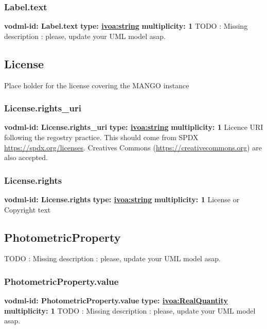     \subsubsection{Label.text}
      \textbf{vodml-id: Label.text} \newline
      \textbf{type: \hyperref[sect:ivoa]{ivoa:string}} \newline
      \textbf{multiplicity: 1} \newline
      TODO : Missing description : please, update your UML model asap.

  \subsection{License}
  \label{sect:License}
    Place holder for the license covering the MANGO instance

    \subsubsection{License.rights\_uri}
      \textbf{vodml-id: License.rights\_uri} \newline
      \textbf{type: \hyperref[sect:ivoa]{ivoa:string}} \newline
      \textbf{multiplicity: 1} \newline
      Licence URI following the regostry practice. This should come from SPDX \url{https://spdx.org/licenses}. Creatives Commons (\url{https://creativecommons.org}) are also accepted.

    \subsubsection{License.rights}
      \textbf{vodml-id: License.rights} \newline
      \textbf{type: \hyperref[sect:ivoa]{ivoa:string}} \newline
      \textbf{multiplicity: 1} \newline
      License or Copyright text

  \subsection{PhotometricProperty}
  \label{sect:PhotometricProperty}
    TODO : Missing description : please, update your UML model asap.

    \subsubsection{PhotometricProperty.value}
      \textbf{vodml-id: PhotometricProperty.value} \newline
      \textbf{type: \hyperref[sect:ivoa]{ivoa:RealQuantity}} \newline
      \textbf{multiplicity: 1} \newline
      TODO : Missing description : please, update your UML model asap.

